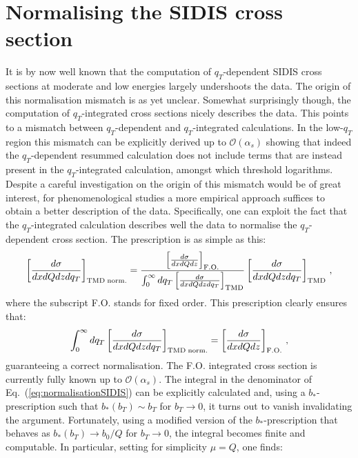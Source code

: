\documentclass[10pt,a4paper]{article}
\begin{document}
\section{Normalising the SIDIS cross section}

It is by now well known that the computation of $q_T$-dependent SIDIS
cross sections at moderate and low energies largely undershoots the
data. The origin of this normalisation mismatch is as yet
unclear. Somewhat surprisingly though, the computation of
$q_T$-integrated cross sections nicely describes the data. This points
to a mismatch between $q_T$-dependent and $q_T$-integrated
calculations. In the low-$q_T$ region this mismatch can be explicitly
derived up to $\mathcal{O}(\alpha_s)$ showing that indeed the
$q_T$-dependent resummed calculation does not include terms that are
instead present in the $q_T$-integrated calculation, amongst which
threshold logarithms. Despite a careful investigation on the origin of
this mismatch would be of great interest, for phenomenological studies
a more empirical approach suffices to obtain a better description of
the data. Specifically, one can exploit the fact that the
$q_T$-integrated calculation describes well the data to normalise the
$q_T$-dependent cross section. The prescription is as simple as this:
\begin{equation}\label{eq:normalisationSIDIS}
\left[\frac{d\sigma}{dxdQdz d q_T}\right]_{\rm TMD\; norm.} =
\frac{\left[\frac{d\sigma}{dxdQdz}\right]_{\rm F.O.}}{\int_0^{\infty} dq_T\left[\frac{d\sigma}{dxdQdz d q_T}\right]_{\rm TMD}}\left[\frac{d\sigma}{dxdQdz d q_T}\right]_{\rm TMD}\,,
\end{equation}
where the subscript F.O. stands for fixed order. This prescription
clearly ensures that:
\begin{equation}
\int_{0}^{\infty}dq_T\left[\frac{d\sigma}{dxdQdz d q_T}\right]_{\rm TMD\; norm.} =
\left[\frac{d\sigma}{dxdQdz}\right]_{\rm F.O.}\,,
\end{equation}
guaranteeing a correct normalisation. The F.O. integrated cross
section is currently fully known up to $\mathcal{O}(\alpha_s)$. The
integral in the denominator of Eq.~(\ref{eq:normalisationSIDIS}) can
be explicitly calculated and, using a $b_*$-prescription such that
$b_*(b_T)\sim b_T$ for $b_T\rightarrow 0$, it turns out to vanish
invalidating the argument. Fortunately, using a modified version of
the $b_*$-prescription that behaves as $b_*(b_T)\rightarrow b_0/Q$ for
$b_T\rightarrow 0$, the integral becomes finite and computable. In
particular, setting for simplicity $\mu=Q$, one finds:
\end{document}
